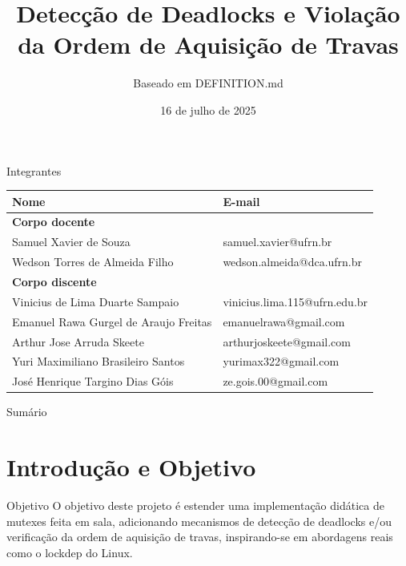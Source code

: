 \documentclass{beamer}
\title[Detecção de Deadlocks]{Detecção de Deadlocks e Violação da Ordem de Aquisição de Travas}
\subtitle{Baseado em DEFINITION.md}
\institute{Universidade Federal do Rio Grande do Norte}
\date{16 de julho de 2025}
\begin{document}
\begin{frame}
  \titlepage
\end{frame}

\begin{frame}{Integrantes}
\begin{table}[ht]
\centering
\begin{tabular}{|p{6.5cm}|p{4.5cm}|}
\hline
\textbf{Nome} & \textbf{E-mail} \\
\hline

\textbf{Corpo docente} \\

\hline
Samuel Xavier de Souza &
samuel.xavier@ufrn.br \\

\hline
Wedson Torres de Almeida Filho &
wedson.almeida@dca.ufrn.br \\
\hline

\textbf{Corpo discente} \\

\hline
Vinicius de Lima Duarte Sampaio &
vinicius.lima.115@ufrn.edu.br \\

\hline
Emanuel Rawa Gurgel de Araujo Freitas &
emanuelrawa@gmail.com \\

\hline
Arthur Jose Arruda Skeete &
arthurjoskeete@gmail.com \\

\hline
Yuri Maximiliano Brasileiro Santos &
yurimax322@gmail.com \\

\hline
José Henrique Targino Dias Góis &
ze.gois.00@gmail.com \\

\hline
\end{tabular}
\end{table}
\end{frame}

\begin{frame}{Sumário}
  \tableofcontents
\end{frame}

\section{Introdução e Objetivo}
\begin{frame}{Objetivo}
O objetivo deste projeto é estender uma implementação
didática de mutexes feita em sala, adicionando mecanismos
de detecção de deadlocks e/ou verificação da ordem de
aquisição de travas, inspirando-se em abordagens reais
como o lockdep do Linux.
\end{frame}
\end{document}
